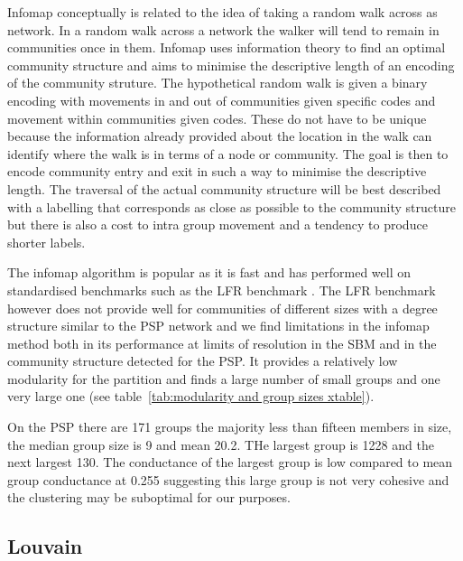 Infomap conceptually is related to the idea of taking a random walk across as network. \cite{rosvall2008maps}In a random walk across a network the walker will tend to remain in communities once in them. Infomap uses information theory to find an optimal community structure and aims to minimise the descriptive length of an encoding of the community struture. The hypothetical random walk is given a binary encoding with movements in and out of communities given specific codes and movement within communities given codes. These do not have to be unique because the information already provided about the location in the walk can identify where the walk is in terms of a node or community. The goal is then to encode community entry and exit in such a way to minimise the descriptive length. The traversal of the actual community structure will be best described with a labelling that corresponds as close as possible to the community structure but there is also a cost to intra group movement and a tendency to produce shorter labels. 

The infomap algorithm is popular as it is fast and has performed well on standardised benchmarks such as the LFR benchmark .\cite{lancichinetti2008benchmark} \cite{newman2018networks} The LFR benchmark however does not provide well for communities of different sizes with a degree structure similar to the PSP network and we find limitations in the infomap method both in its performance at limits of resolution in the SBM and in the community structure detected for the PSP. It provides a relatively low modularity for the partition and finds a large number of small groups and one very large one (see table~\ref{tab:modularity and group sizes xtable}). 

On the PSP there are 171 groups the majority less than fifteen members in size, the median group size is 9 and mean 20.2. THe largest group is 1228 and the next largest 130. The conductance of the largest group is low compared to mean group conductance at 0.255 suggesting this large group is not very cohesive and the clustering may be suboptimal for our purposes. 




\subsection{Louvain}

\cite{blondel2008fast}

